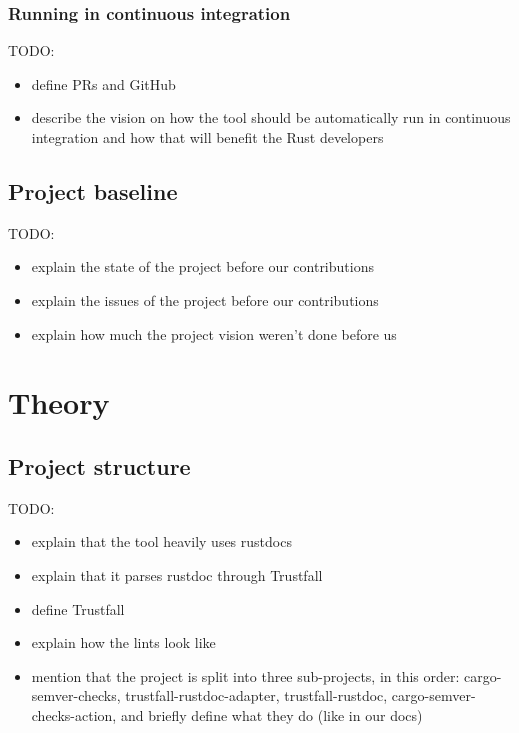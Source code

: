 \documentclass[licencjacka,en]{pracamgr}
\begin{document}
\subsection{Running in continuous integration}

TODO:
\begin{itemize}
	\item define PRs and GitHub
	\item describe the vision on how the tool should be automatically run in continuous integration
		and how that will benefit the Rust developers
\end{itemize}

\section{Project baseline}

TODO:
\begin{itemize}
	\item explain the state of the project before our contributions
	\item explain the issues of the project before our contributions
	\item explain how much the project vision weren't done before us
\end{itemize}


\chapter{Theory}\label{r:chapter_theory}

\section{Project structure}\label{r:section_projectstructure}

TODO:
\begin{itemize}
	\item explain that the tool heavily uses rustdocs
	\item explain that it parses rustdoc through Trustfall
	\item define Trustfall
	\item explain how the lints look like
	\item mention that the project is split into three sub-projects,
		in this order: cargo-semver-checks, trustfall-rustdoc-adapter, trustfall-rustdoc,
		cargo-semver-checks-action,
		and briefly define what they do (like in our docs)
\end{itemize}
\end{document}
